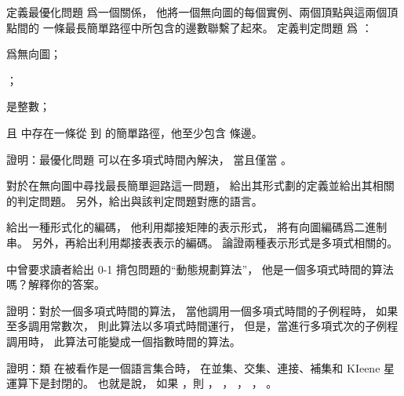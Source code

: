 \startsection[
  title={Polynomial time},
]

\startEXERCISE
定義最優化問題  爲一個關係，
他將一個無向圖的每個實例、兩個頂點與這兩個頂點間的
一條最長簡單路徑中所包含的邊數聯繫了起來。
定義判定問題  爲 ：
\startigBase[2]
\item {} 爲無向圖；
\item {}；
\item {} 是整數；
\item 且  中存在一條從  到  的簡單路徑，他至少包含  條邊。
\stopigBase

證明：最優化問題  可以在多項式時間內解決，
當且僅當 。
\stopEXERCISE

\startANSWER
{}
\stopANSWER

\startEXERCISE
對於在無向圖中尋找最長簡單迴路這一問題，
給出其形式劃的定義並給出其相關的判定問題。
另外，給出與該判定問題對應的語言。
\stopEXERCISE

\startANSWER
{}
\stopANSWER

\startEXERCISE
給出一種形式化的編碼，
他利用鄰接矩陣的表示形式，
將有向圖編碼爲二進制串。
另外，再給出利用鄰接表表示的編碼。
論證兩種表示形式是多項式相關的。
\stopEXERCISE

\startANSWER
{}
\stopANSWER

\startEXERCISE
\inexercise[16.2-2] 中曾要求讀者給出 0-1 揹包問題的“動態規劃算法”，
他是一個多項式時間的算法嗎？解釋你的答案。
\stopEXERCISE

\startANSWER
{}
\stopANSWER

\startEXERCISE
證明：對於一個多項式時間的算法，
當他調用一個多項式時間的子例程時，
如果至多調用常數次，
則此算法以多項式時間運行，
但是，當進行多項式次的子例程調用時，
此算法可能變成一個指數時間的算法。
\stopEXERCISE

\startANSWER
{}
\stopANSWER

\startEXERCISE
證明：類  在被看作是一個語言集合時，
在並集、交集、連接、補集和 KIeene 星運算下是封閉的。
也就是說，
如果 ，則 ，
 ， ， ， 。
\stopEXERCISE

\startANSWER
{}
\stopANSWER

\stopsection
